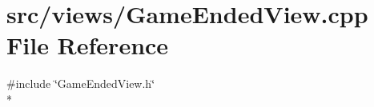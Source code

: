 \section{src/views/\-Game\-Ended\-View.cpp File Reference}
\label{_game_ended_view_8cpp}
{\ttfamily \#include \char`\"{}Game\-Ended\-View.\-h\char`\"{}}\\*
